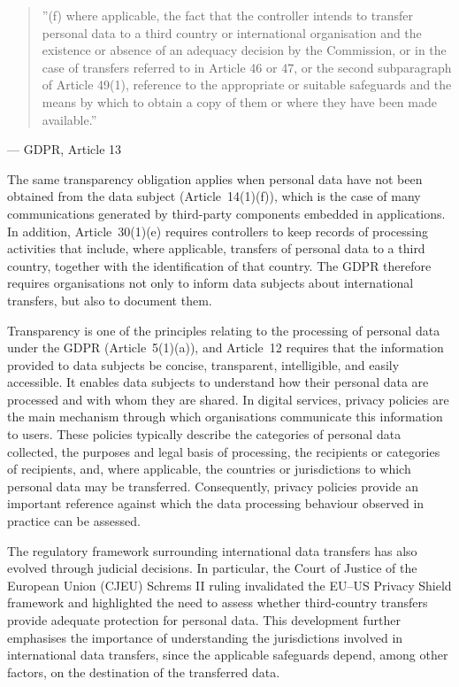 \begin{quote}
    ''(f) where applicable, the fact that the controller intends to transfer personal data to a third country or international organisation and the existence or absence of an adequacy decision by the Commission, or in the case of transfers referred to in Article 46 or 47, or the second subparagraph of Article 49(1), reference to the appropriate or suitable safeguards and the means by which to obtain a copy of them or where they have been made available.''
\end{quote}
\hfill --- GDPR, Article 13 \cite{REGULATIONSRelevance}

The same transparency obligation applies when personal data have not been obtained from the data subject (Article~14(1)(f)), which is the case of many communications generated by third-party components embedded in applications. In addition, Article~30(1)(e) requires controllers to keep records of processing activities that include, where applicable, transfers of personal data to a third country, together with the identification of that country. The GDPR therefore requires organisations not only to inform data subjects about international transfers, but also to document them.

Transparency is one of the principles relating to the processing of personal data under the GDPR (Article~5(1)(a)), and Article~12 requires that the information provided to data subjects be concise, transparent, intelligible, and easily accessible. It enables data subjects to understand how their personal data are processed and with whom they are shared. In digital services, privacy policies are the main mechanism through which organisations communicate this information to users. These policies typically describe the categories of personal data collected, the purposes and legal basis of processing, the recipients or categories of recipients, and, where applicable, the countries or jurisdictions to which personal data may be transferred. Consequently, privacy policies provide an important reference against which the data processing behaviour observed in practice can be assessed.

The regulatory framework surrounding international data transfers has also evolved through judicial decisions. In particular, the Court of Justice of the European Union (CJEU) Schrems II \cite{CourtII} ruling invalidated the EU--US Privacy Shield framework and highlighted the need to assess whether third-country transfers provide adequate protection for personal data. This development further emphasises the importance of understanding the jurisdictions involved in international data transfers, since the applicable safeguards depend, among other factors, on the destination of the transferred data.

